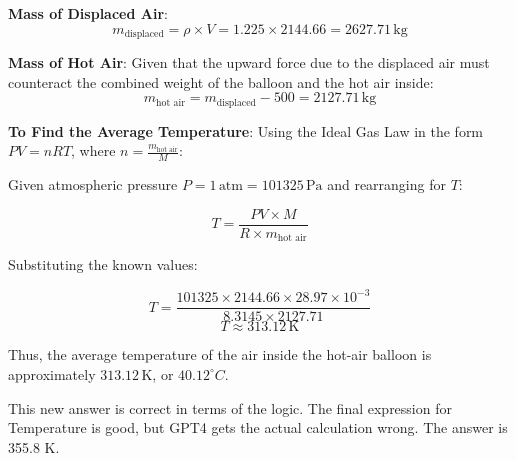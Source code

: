 \documentclass[12pt]{article}
\begin{document}
\textbf{Mass of Displaced Air}:
\[ m_{\text{displaced}} = \rho \times V = 1.225 \times 2144.66 = 2627.71 \, \text{kg} \]

\textbf{Mass of Hot Air}:
Given that the upward force due to the displaced air must counteract the combined weight of the balloon and the hot air inside:
\[ m_{\text{hot air}} = m_{\text{displaced}} - 500 = 2127.71 \, \text{kg} \]

\textbf{To Find the Average Temperature}:
Using the Ideal Gas Law in the form \( PV = nRT \), where \( n = \frac{m_{\text{hot air}}}{M} \):

Given atmospheric pressure \( P = 1 \, \text{atm} = 101325 \, \text{Pa} \) and rearranging for \( T \):

\[ T = \frac{PV \times M}{R \times m_{\text{hot air}}} \]

Substituting the known values:

\[ T = \frac{101325 \times 2144.66 \times 28.97 \times 10^{-3}}{8.3145 \times 2127.71} \]
\[ T \approx 313.12 \, \text{K} \]

Thus, the average temperature of the air inside the hot-air balloon is approximately \( 313.12 \, \text{K} \), or \( 40.12^\circ C \).


This new answer is correct in terms of the logic. The final expression for Temperature is good, but GPT4 gets the actual calculation wrong. The answer is 355.8 K. 
\end{document}
